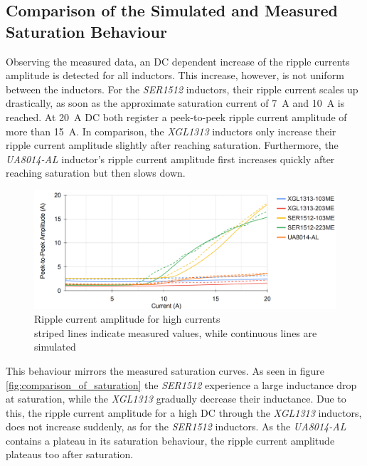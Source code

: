 \subsection{Comparison of the Simulated and Measured Saturation Behaviour}
Observing the measured data, an \ac{DC} dependent increase of the ripple currents amplitude is detected for all inductors. This increase, however, is not uniform between the inductors. For the \textit{SER1512} inductors, their ripple current scales up drastically, as soon as the approximate saturation current of \SI{7}{\A} and \SI{10}{\A} is reached. At \SI{20}{\A} \ac{DC} both register a peek-to-peek ripple current amplitude of more than \SI{15}{\A}. In comparison, the \textit{XGL1313} inductors only increase their ripple current amplitude slightly after reaching saturation. Furthermore, the \textit{UA8014-AL} inductor's ripple current amplitude first increases quickly after reaching saturation but then slows down.
\begin{figure}[H]
    \centering
    \includegraphics[width=1\linewidth]{Bilder//Kapitel4/High Current_2.png}
    \caption{Ripple current amplitude for high currents \\striped lines indicate measured values, while continuous lines are simulated}
    \label{fig:ripple_current_amplitude_for_high_currents}
\end{figure}
This behaviour mirrors the measured saturation curves. As seen in figure \ref{fig:comparison_of_saturation} the \textit{SER1512} experience a large inductance drop at saturation, while the \textit{XGL1313} gradually decrease their inductance. Due to this, the ripple current amplitude for a high \ac{DC} through the \textit{XGL1313} inductors, does not increase suddenly, as for the \textit{SER1512} inductors. As the \textit{UA8014-AL} contains a plateau in its saturation behaviour, the ripple current amplitude plateaus too after saturation.\\
